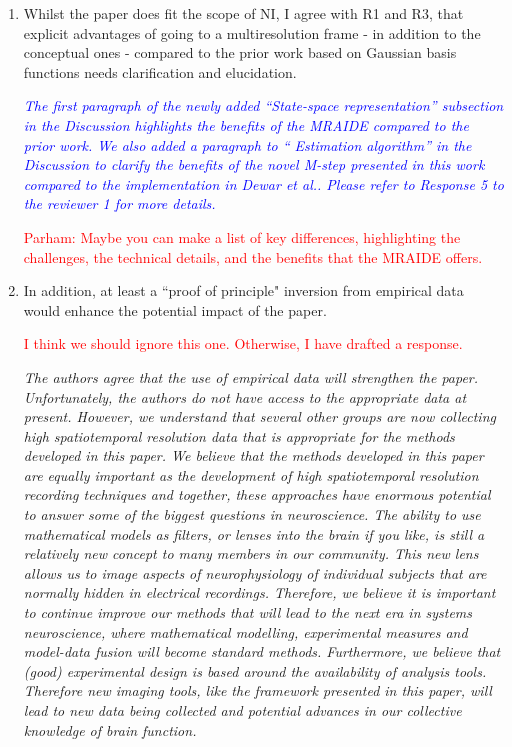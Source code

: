 \documentclass{article}
\newcommand{\dean}[1]{\textcolor{red}{#1}}
\newcommand{\parham}[1]{\textcolor{blue}{#1}}
\begin{document}
\begin{enumerate}
\item Whilst the paper does fit the scope of NI, I agree with R1 and R3, that explicit advantages of going to a multiresolution frame - in addition to the conceptual ones - compared to the prior work based on Gaussian basis functions needs clarification and elucidation.
 
\emph{\parham{The first paragraph of the newly added ``State-space representation'' subsection in the Discussion  highlights the benefits of the MRAIDE compared to the prior work. We also added a paragraph to `` Estimation algorithm'' in the Discussion to clarify the benefits of the novel M-step presented in this work compared to the implementation in Dewar et al.. Please refer to Response 5 to the reviewer 1 for more details.}}


\dean{Parham: Maybe you can make a list of key differences, highlighting the challenges, the technical details, and the benefits that the MRAIDE offers.}

\item  In addition, at least a ``proof of principle" inversion from empirical data would enhance the potential impact of the paper. 

\dean{I think we should ignore this one. Otherwise, I have drafted a response.}


\emph{The authors agree that the use of empirical data will strengthen the paper. Unfortunately, the authors do not have access to the appropriate data at present. However, we understand that several other groups are now collecting high spatiotemporal resolution data that is appropriate for the methods developed in this paper. We believe that the methods developed in this paper are equally important as the development of high spatiotemporal resolution recording techniques and together, these approaches have enormous potential to answer some of the biggest questions in neuroscience. The ability to use mathematical models as filters, or lenses into the brain if you like, is still a relatively new concept to many members in our community. This new lens allows us to image aspects of neurophysiology of individual subjects that are normally hidden in electrical recordings. Therefore, we believe it is important to continue improve our methods that will lead to the next era in systems neuroscience, where mathematical modelling, experimental measures and model-data fusion will become standard methods. Furthermore, we believe that (good) experimental design is based around the availability of analysis tools. Therefore new imaging tools, like the framework presented in this paper, will lead to new data being collected and potential advances in our collective knowledge of brain function. } 
	
\end{enumerate}
\end{document}
